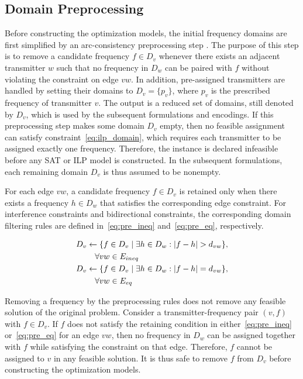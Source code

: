 \subsection{Domain Preprocessing}
\label{subsec:preprocessing}
Before constructing the optimization models, the initial frequency domains are first simplified by an arc-consistency preprocessing step \cite{Aardal2007, Dib2009}. 
The purpose of this step is to remove a candidate frequency $f \in D_v$ whenever there exists an adjacent transmitter $w$ such that no frequency in $D_w$ can be paired with $f$ without violating the constraint on edge $vw$.
In addition, pre-assigned transmitters are handled by setting their domains to $D_v=\{p_v\}$, where $p_v$ is the prescribed frequency of transmitter $v$.
The output is a reduced set of domains, still denoted by $D_v$, which is used by the subsequent formulations and encodings.
If this preprocessing step makes some domain $D_v$ empty, then no feasible assignment can satisfy constraint~\eqref{eq:ilp_domain}, which requires each transmitter to be assigned exactly one frequency. Therefore, the instance is declared infeasible before any SAT or ILP model is constructed. In the subsequent formulations, each remaining domain $D_v$ is thus assumed to be nonempty.

For each edge $vw$, a candidate frequency $f \in D_v$ is retained only when there exists a frequency $h \in D_w$ that satisfies the corresponding edge constraint.
For interference constraints and bidirectional constraints, the corresponding domain filtering rules are defined in~\eqref{eq:pre_ineq} and~\eqref{eq:pre_eq}, respectively.

\begin{align}
    D_v &\leftarrow \{ f \in D_v \mid \exists h \in D_w : |f - h| > d_{vw} \},
    \notag \\
    &\quad \forall vw \in E_{ineq} \label{eq:pre_ineq} \\
    D_v &\leftarrow \{ f \in D_v \mid \exists h \in D_w : |f - h| = d_{vw} \},
    \notag \\
    &\quad \forall vw \in E_{eq} \label{eq:pre_eq}
\end{align}
 
Removing a frequency by the preprocessing rules does not remove any feasible solution of the original problem. Consider a transmitter-frequency pair $(v,f)$ with $f \in D_v$. 
If $f$ does not satisfy the retaining condition in either~\eqref{eq:pre_ineq} or~\eqref{eq:pre_eq} for an edge $vw$, then no frequency in $D_w$ can be assigned together with $f$ while satisfying the constraint on that edge. 
Therefore, $f$ cannot be assigned to $v$ in any feasible solution. It is thus safe to remove $f$ from $D_v$ before constructing the optimization models.
